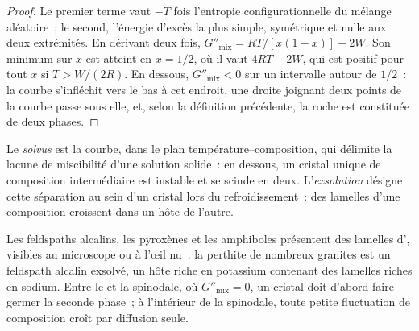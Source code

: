 \begin{proof}
Le premier terme vaut $-T$ fois l'entropie configurationnelle du mélange aléatoire~;
le second, l'énergie d'excès la plus simple, symétrique et nulle aux deux extrémités.
En dérivant deux fois, $G''_{\text{mix}} = RT/[x(1 - x)] - 2W$. Son minimum
sur $x$ est atteint en $x = 1/2$, où il vaut $4RT - 2W$, qui est positif pour
tout $x$ si $T > W/(2R)$. En dessous, $G''_{\text{mix}} < 0$ sur un intervalle
autour de $1/2$~: la courbe s'infléchit vers le bas à cet endroit, une droite joignant deux points
de la courbe passe sous elle, et, selon la définition précédente, la roche
est constituée de deux phases.
\end{proof}

\begin{definition}\label{def:b3:petrological-thermodynamics:solvus}
Le \emph{solvus} est la courbe, dans le plan température--composition,
qui délimite la lacune de miscibilité d'une solution solide~: en dessous, un
cristal unique de composition intermédiaire est instable et se scinde en deux.
L'\emph{exsolution} désigne cette
séparation au sein d'un cristal lors du refroidissement~: des lamelles d'une
composition croissent dans un hôte de l'autre.
\end{definition}

Les feldspaths alcalins, les pyroxènes et les amphiboles présentent des lamelles
d', visibles au microscope ou à l'œil nu~: la perthite de nombreux
granites est un feldspath alcalin exsolvé, un hôte riche en potassium contenant
des lamelles riches en sodium. Entre le  et la spinodale, où $G''_{\text{mix}} = 0$,
un cristal doit d'abord faire germer la seconde phase~; à l'intérieur de la
spinodale, toute petite fluctuation de composition croît par diffusion seule.


